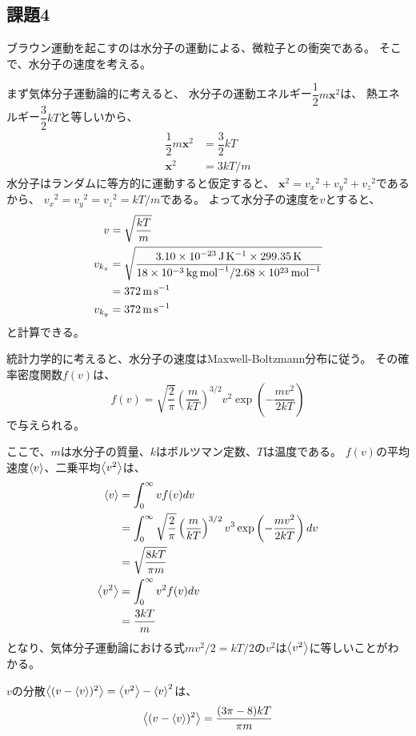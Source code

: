 \subsection{課題4}
ブラウン運動を起こすのは水分子の運動による、微粒子との衝突である。
そこで、水分子の速度を考える。

まず気体分子運動論的に考えると、
水分子の運動エネルギー$\dfrac{1}{2}m\bm{x}^2$は、
熱エネルギー$\dfrac{3}{2}kT$と等しいから、
\begin{align}
    \dfrac{1}{2}m\bm{x}^2 & = \dfrac{3}{2}kT \nonumber \\
    \bm{x}^2              & = 3kT/m \nonumber
\end{align}
水分子はランダムに等方的に運動すると仮定すると、
$\bm{x}^2 = {v_x}^2 + {v_y}^2 + {v_z}^2$であるから、
${v_x}^2 = {v_y}^2 = {v_z}^2 = kT/m$である。
よって水分子の速度を$v$とすると、
\begin{align}
    v       & = \sqrt{\dfrac{kT}{m}} \nonumber                                                                                                                  \\
    v_{k_x} & = \sqrt{\dfrac{\SI{3.10E-23}{\joule\per\kelvin} \times \SI{299.35}{\kelvin}}{\SI{18E-3}{\kilo\gram\per\mol} / \SI{2.68E23}{\per\mole}}} \nonumber \\
            & = \SI{372}{\meter\per\second}                                                                                                                     \\
    v_{k_y} & = \SI{372}{\meter\per\second}
\end{align}
と計算できる。

統計力学的に考えると、水分子の速度はMaxwell-Boltzmann分布に従う。
その確率密度関数$f(v)$は、
\begin{equation}\label{eq:maxwell-boltzmann-distribution}
    f(v) = \sqrt{\dfrac{2}{\pi}} \left(\dfrac{m}{kT}\right)^{3/2} v^2 \exp\left(-\dfrac{mv^2}{2kT}\right)
\end{equation}
で与えられる。

ここで、$m$は水分子の質量、$k$はボルツマン定数、$T$は温度である。
$f(v)$の平均速度$\left< v \right>$、二乗平均$\left< v^2 \right>$は、
\begin{align*}
    \left< v \right>   & = \int_0^\infty vf(v)dv                                                                                               \\
             & = \int_{0}^{\infty} \sqrt{\dfrac{2}{\pi}} \left(\dfrac{m}{kT}\right)^{3/2} v^3 \exp\left(-\dfrac{mv^2}{2kT}\right) dv \\
             & = \sqrt{\dfrac{8kT}{\pi m}}                                                                                           \\
    \left< v^2 \right> & = \int_0^\infty v^2f(v)dv                                                                                             \\
             & = \dfrac{3kT}{m}
\end{align*}
となり、気体分子運動論における式$mv^2/2 = kT/2$の$v^2$は$\left< v^2 \right>$に等しいことがわかる。

$v$の分散$\left< (v - \left< v \right>)^2 \right>=\left< v^2 \right>-\left< v \right>^2$は、
\begin{equation}
    \left< (v - \left< v \right>)^2 \right> = \dfrac{(3\pi - 8)kT}{\pi m}
\end{equation}
